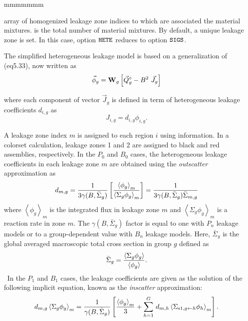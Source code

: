 \begin{ListeDeDescription}{mmmmmmm}
\item[\dusa{imergl}] array of homogenized leakage zone indices to which are associated the material mixtures.  is the
total number of material mixtures. By default, a unique leakage zone is set. In this case, option $\moc{HETE}$ reduces to option $\moc{SIGS}$.

The simplified heterogeneous leakage model is based on a generalization of \eq(eq5.33), now written as
\begin{equation}
\vec\phi_g={\bf W}_g\left[ \vec Q^\diamond_g-B^2 \ \vec J_g\right]
\label{eq:eq5.36a}
\end{equation}

\noindent where each component of vector $\vec J_g$ is defined in term of heterogeneous leakage coefficients $d_{i,g}$ as
\begin{equation}
J_{i,g}=d_{i,g} \phi_{i,g}.
\label{eq:eq5.36b}
\end{equation}

A leakage zone index $m$ is assigned to each region $i$ using  information. In a colorset calculation, leakage zones 1 and 2
are assigned to black and red assemblies, respectively. In the $P_0$ and $B_0$ cases, the heterogeneous leakage coefficients in each leakage zone $m$
are obtained using the {\sl outscatter} approximation as
\begin{equation}
d_{m,g} = {1\over 3\gamma(B,\bar\Sigma_g)}\left[ {\left<\phi_g\right>_m\over \left<\Sigma_g\phi_g\right>_m}\right]={1\over 3\gamma(B,\bar\Sigma_g)\bar\Sigma_{m,g}}
\label{eq:eq5.36c}
\end{equation}
\noindent where $\left<\phi_g\right>_m$ is the integrated flux in leakage zone $m$ and $\left<\Sigma_g\phi_g\right>_m$ is a reaction rate
in zone $m$. The $\gamma(B,\bar\Sigma_g)$ factor is equal to one with $P_n$ leakage models or to a group-dependent value with $B_n$
leakage models.\cite{PIP2009} Here, $\bar\Sigma_g$ is the global averaged macroscopic total cross section in group $g$ defined as
\begin{equation}
\bar\Sigma_g={\left<\Sigma_g\phi_g\right> \over \left<\phi_g\right>}.
\label{eq:eq5.36d}
\end{equation}
\
In the $P_1$ and $B_1$ cases, the leakage coefficients are given as the solution of the following implicit equation, known as the {\sl inscatter} approximation:
\begin{equation}
d_{m,g}\left<\Sigma_g\phi_g\right>_m = {1\over \gamma(B,\bar\Sigma_g)}\left[ {\left<\phi_g\right>_m\over 3}+
\sum_{h=1}^G \, d_{m,h} \left<\Sigma_{{\rm s1},g \leftarrow h}\phi_h\right>_m\right] .
\label{eq:eq5.36e}
\end{equation}


\end{ListeDeDescription}
